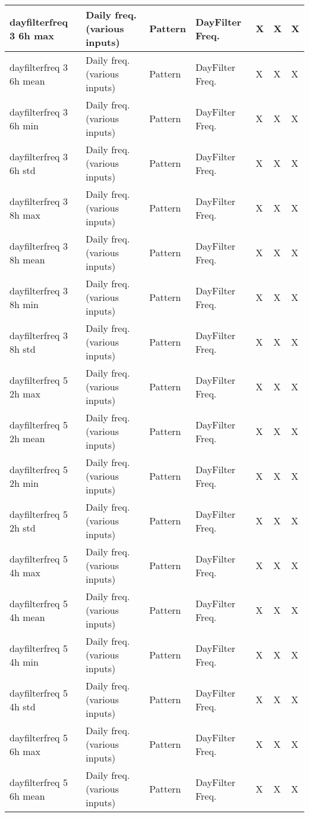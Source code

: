 {{\begin{longtable}[l]{ | p{4cm} | p{4cm} | p{1cm} | p{2cm} | p{0.3cm} | p{0.3cm} | p{0.3cm} |}
	 dayfilterfreq 3 6h max & Daily freq. (various inputs) & Pattern & DayFilter Freq. & X & X & X \\ \hline
	 dayfilterfreq 3 6h mean & Daily freq. (various inputs) & Pattern & DayFilter Freq. & X & X & X \\ \hline
	 dayfilterfreq 3 6h min & Daily freq. (various inputs) & Pattern & DayFilter Freq. & X & X & X \\ \hline
	 dayfilterfreq 3 6h std & Daily freq. (various inputs) & Pattern & DayFilter Freq. & X & X & X \\ \hline
	 dayfilterfreq 3 8h max & Daily freq. (various inputs) & Pattern & DayFilter Freq. & X & X & X \\ \hline
	 dayfilterfreq 3 8h mean & Daily freq. (various inputs) & Pattern & DayFilter Freq. & X & X & X \\ \hline
	 dayfilterfreq 3 8h min & Daily freq. (various inputs) & Pattern & DayFilter Freq. & X & X & X \\ \hline
	 dayfilterfreq 3 8h std & Daily freq. (various inputs) & Pattern & DayFilter Freq. & X & X & X \\ \hline
	 dayfilterfreq 5 2h max & Daily freq. (various inputs) & Pattern & DayFilter Freq. & X & X & X \\ \hline
	 dayfilterfreq 5 2h mean & Daily freq. (various inputs) & Pattern & DayFilter Freq. & X & X & X \\ \hline
	 dayfilterfreq 5 2h min & Daily freq. (various inputs) & Pattern & DayFilter Freq. & X & X & X \\ \hline
	 dayfilterfreq 5 2h std & Daily freq. (various inputs) & Pattern & DayFilter Freq. & X & X & X \\ \hline
	 dayfilterfreq 5 4h max & Daily freq. (various inputs) & Pattern & DayFilter Freq. & X & X & X \\ \hline
	 dayfilterfreq 5 4h mean & Daily freq. (various inputs) & Pattern & DayFilter Freq. & X & X & X \\ \hline
	 dayfilterfreq 5 4h min & Daily freq. (various inputs) & Pattern & DayFilter Freq. & X & X & X \\ \hline
	 dayfilterfreq 5 4h std & Daily freq. (various inputs) & Pattern & DayFilter Freq. & X & X & X \\ \hline
	 dayfilterfreq 5 6h max & Daily freq. (various inputs) & Pattern & DayFilter Freq. & X & X & X \\ \hline
	 dayfilterfreq 5 6h mean & Daily freq. (various inputs) & Pattern & DayFilter Freq. & X & X & X \\ \hline

\end{longtable}}}
